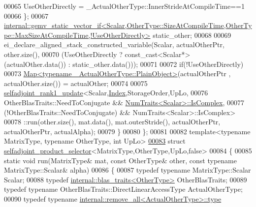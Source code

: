\begin{DoxyCode}
00065       UseOtherDirectly = \_ActualOtherType::InnerStrideAtCompileTime==1
00066     \};
00067     
      \hyperlink{struct_eigen_1_1internal_1_1gemv__static__vector__if}{
      internal::gemv\_static\_vector\_if<Scalar,OtherType::SizeAtCompileTime,OtherType::MaxSizeAtCompileTime,!UseOtherDirectly>}
       static\_other;
00068 
00069     ei\_declare\_aligned\_stack\_constructed\_variable(Scalar, actualOtherPtr, other.size(),
00070       (UseOtherDirectly ? \textcolor{keyword}{const\_cast<}Scalar*\textcolor{keyword}{>}(actualOther.data()) : static\_other.data()));
00071       
00072     \textcolor{keywordflow}{if}(!UseOtherDirectly)
00073       \hyperlink{group___core___module_class_eigen_1_1_map}{Map<typename \_ActualOtherType::PlainObject>}(actualOtherPtr
      , actualOther.size()) = actualOther;
00074     
00075     \hyperlink{struct_eigen_1_1selfadjoint__rank1__update}{selfadjoint\_rank1\_update}<Scalar,\hyperlink{namespace_eigen_a62e77e0933482dafde8fe197d9a2cfde}{Index},StorageOrder,UpLo,
00076                               OtherBlasTraits::NeedToConjugate  && 
      \hyperlink{group___core___module_struct_eigen_1_1_num_traits}{NumTraits<Scalar>::IsComplex},
00077                             (!OtherBlasTraits::NeedToConjugate) && NumTraits<Scalar>::IsComplex>
00078           ::run(other.size(), mat.data(), mat.outerStride(), actualOtherPtr, actualOtherPtr, actualAlpha);
00079   \}
00080 \};
00081 
00082 \textcolor{keyword}{template}<\textcolor{keyword}{typename} MatrixType, \textcolor{keyword}{typename} OtherType, \textcolor{keywordtype}{int} UpLo>
\hyperlink{struct_eigen_1_1selfadjoint__product__selector_3_01_matrix_type_00_01_other_type_00_01_up_lo_00_01false_01_4}{00083} \textcolor{keyword}{struct }\hyperlink{struct_eigen_1_1selfadjoint__product__selector}{selfadjoint\_product\_selector}<MatrixType,OtherType,UpLo,false>
00084 \{
00085   \textcolor{keyword}{static} \textcolor{keywordtype}{void} run(MatrixType& mat, \textcolor{keyword}{const} OtherType& other, \textcolor{keyword}{const} \textcolor{keyword}{typename} MatrixType::Scalar& alpha)
00086   \{
00087     \textcolor{keyword}{typedef} \textcolor{keyword}{typename} MatrixType::Scalar Scalar;
00088     \textcolor{keyword}{typedef} \hyperlink{struct_eigen_1_1internal_1_1blas__traits}{internal::blas\_traits<OtherType>} OtherBlasTraits;
00089     \textcolor{keyword}{typedef} \textcolor{keyword}{typename} OtherBlasTraits::DirectLinearAccessType ActualOtherType;
00090     \textcolor{keyword}{typedef} \textcolor{keyword}{typename} \hyperlink{group___sparse_core___module}{internal::remove\_all<ActualOtherType>::type}

\end{DoxyCode}
